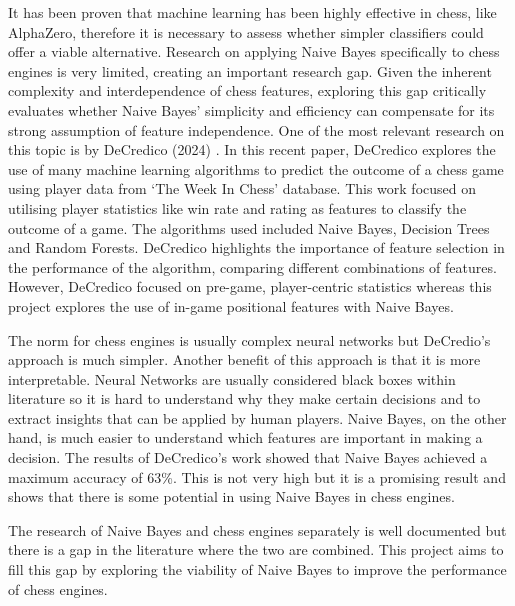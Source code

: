 It has been proven that machine learning has been highly effective in chess, like AlphaZero, therefore it is necessary to assess whether simpler classifiers could offer a viable alternative. Research on applying Naive Bayes specifically to chess engines is very limited, creating an important research gap. Given the inherent complexity and interdependence of chess features, exploring this gap critically evaluates whether Naive Bayes' simplicity and efficiency can compensate for its strong assumption of feature independence. One of the most relevant research on this topic is by DeCredico (2024) \cite{decredicoUsingMachineLearning}. In this recent paper, DeCredico explores the use of many machine learning algorithms to predict the outcome of a chess game using player data from `The Week In Chess' database. This work focused on utilising player statistics like win rate and rating as features to classify the outcome of a game. The algorithms used included Naive Bayes, Decision Trees and Random Forests. DeCredico highlights the importance of feature selection in the performance of the algorithm, comparing different combinations of features. However, DeCredico focused on pre-game, player-centric statistics whereas this project explores the use of in-game positional features with Naive Bayes. 

The norm for chess engines is usually complex neural networks but DeCredio's approach is much simpler. Another benefit of this approach is that it is more interpretable. Neural Networks are usually considered black boxes \cite{kleinNeuralNetworksChess2022} \cite{liuInterpretableNeuralNetworks2023} within literature so it is hard to understand why they make certain decisions and to extract insights that can be applied by human players. Naive Bayes, on the other hand, is much easier to understand which features are important in making a decision. The results of DeCredico's work showed that Naive Bayes achieved a maximum accuracy of 63\%. This is not very high but it is a promising result and shows that there is some potential in using Naive Bayes in chess engines. 

The research of Naive Bayes and chess engines separately is well documented but there is a gap in the literature where the two are combined. This project aims to fill this gap by exploring the viability of Naive Bayes to improve the performance of chess engines.